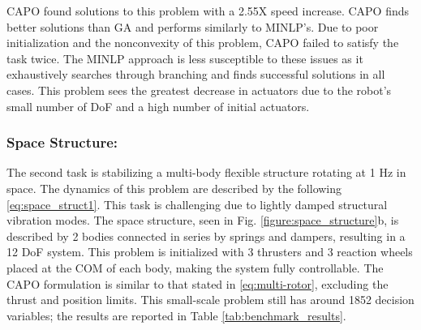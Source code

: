     
CAPO found solutions to this problem with a 2.55X speed increase. CAPO finds better solutions than GA and performs similarly to MINLP's. Due to poor initialization and the nonconvexity of this problem, CAPO failed to satisfy the task twice. The MINLP approach is less susceptible to these issues as it exhaustively searches through branching and finds successful solutions in all cases. This problem sees the greatest decrease in actuators due to the robot's small number of DoF and a high number of initial actuators. 
\subsubsection{Space Structure:}
The second task is stabilizing a multi-body flexible structure rotating at 1 Hz in space. The dynamics of this problem are described by the following \eqref{eq:space_struct1}. This task is challenging due to lightly damped structural vibration modes. %
The space structure, seen in Fig. \ref{figure:space_structure}b, is described by 2 bodies connected in series by springs and dampers, resulting in a 12 DoF system. This problem is initialized with 3 thrusters and 3 reaction wheels placed at the COM of each body, making the system fully controllable. The CAPO formulation is similar to that stated in \eqref{eq:multi-rotor}, excluding the thrust and position limits. This small-scale problem still has around 1852 decision variables; the results are reported in Table \ref{tab:benchmark_results}. 

